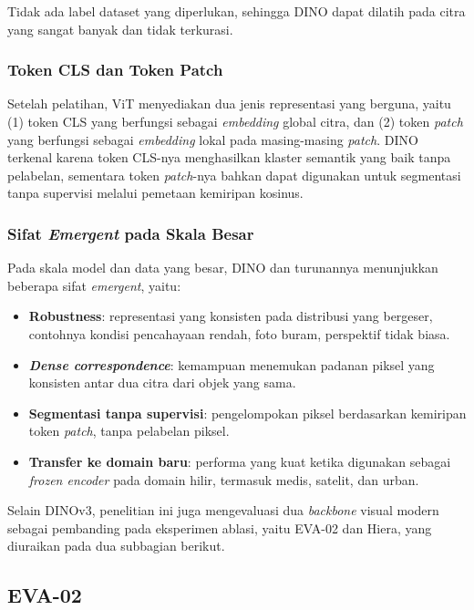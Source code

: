 Tidak ada label dataset yang diperlukan, sehingga DINO dapat dilatih pada citra yang sangat banyak dan tidak terkurasi.

\subsubsection{Token CLS dan Token Patch}

Setelah pelatihan, ViT menyediakan dua jenis representasi yang berguna, yaitu (1) token CLS yang berfungsi sebagai \textit{embedding} global citra, dan (2) token \textit{patch} yang berfungsi sebagai \textit{embedding} lokal pada masing-masing \textit{patch}. DINO terkenal karena token CLS-nya menghasilkan klaster semantik yang baik tanpa pelabelan, sementara token \textit{patch}-nya bahkan dapat digunakan untuk segmentasi tanpa supervisi melalui pemetaan kemiripan kosinus.

\subsubsection{Sifat \textit{Emergent} pada Skala Besar}

Pada skala model dan data yang besar, DINO dan turunannya menunjukkan beberapa sifat \textit{emergent}, yaitu:

\begin{itemize}
    \item \textbf{Robustness}: representasi yang konsisten pada distribusi yang bergeser, contohnya kondisi pencahayaan rendah, foto buram, perspektif tidak biasa.
    \item \textbf{\textit{Dense correspondence}}: kemampuan menemukan padanan piksel yang konsisten antar dua citra dari objek yang sama.
    \item \textbf{Segmentasi tanpa supervisi}: pengelompokan piksel berdasarkan kemiripan token \textit{patch}, tanpa pelabelan piksel.
    \item \textbf{Transfer ke domain baru}: performa yang kuat ketika digunakan sebagai \textit{frozen encoder} pada domain hilir, termasuk medis, satelit, dan urban.
\end{itemize}

Selain DINOv3, penelitian ini juga mengevaluasi dua \textit{backbone} visual modern sebagai pembanding pada eksperimen ablasi, yaitu EVA-02 dan Hiera, yang diuraikan pada dua subbagian berikut.

\subsection{EVA-02}
\label{sec:eva02}

